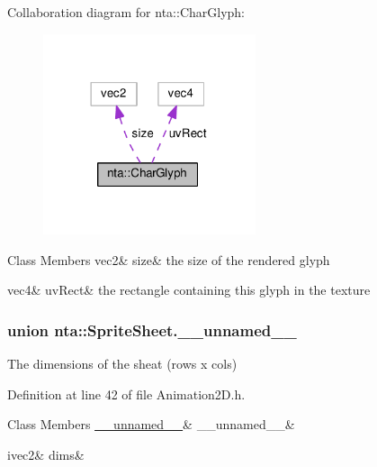 Collaboration diagram for nta\+:\+:Char\+Glyph\+:\nopagebreak
\begin{figure}[H]
\begin{center}
\leavevmode
\includegraphics[width=177pt]{df/ddc/structnta_1_1CharGlyph__coll__graph}
\end{center}
\end{figure}
\begin{DoxyFields}{Class Members}
\mbox{\label{namespacenta_aa2a40e6fe48ffadb4c7c95af7e82db91}} 
vec2&
size&
the size of the rendered glyph \\
\hline

\mbox{\label{namespacenta_a46d9ea9c38c8bf5e1c1679e938019f53}} 
vec4&
uvRect&
the rectangle containing this glyph in the texture \\
\hline

\end{DoxyFields}
\label{unionnta_1_1SpriteSheet_8____unnamed____}
\subsubsection{union nta\+:\+:Sprite\+Sheet.\+\_\+\+\_\+unnamed\+\_\+\+\_\+}
The dimensions of the sheat (rows x cols) 

Definition at line 42 of file Animation2\+D.\+h.

\begin{DoxyFields}{Class Members}
\mbox{\label{namespacenta_a1378d7d8767899287b0407055215aa4e}} 
\hyperlink{namespacenta_df/d10/structnta_1_1SpriteSheet_8____unnamed_____8____unnamed____}{\_\_unnamed\_\_}&
\_\_unnamed\_\_&
\\
\hline

\mbox{\label{namespacenta_a5927205243f12cdc70612cba6dc874fa}} 
ivec2&
dims&
\\
\hline

\end{DoxyFields}
\label{structnta_1_1SpriteSheet_8____unnamed_____8____unnamed____}
